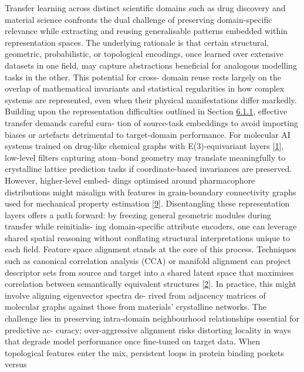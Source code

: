 \documentclass[
]{article}
\begin{document}
Transfer learning across distinct scientific domains such as drug
discovery and material science confronts the dual challenge of
preserving domain-specific relevance while extracting and reusing
generalisable patterns embedded within representation spaces. The
underlying rationale is that certain structural, geometric,
probabilistic, or topological encodings, once learned over extensive
datasets in one field, may capture abstractions beneficial for analogous
modelling tasks in the other. This potential for cross- domain reuse
rests largely on the overlap of mathematical invariants and statistical
regularities in how complex systems are represented, even when their
physical manifestations differ markedly. Building upon the
representation difficulties outlined in Section
\protect\hyperlink{shared-representation-challenges}{6.1.1}, effective
transfer demands careful cura- tion of source-task embeddings to avoid
importing biases or artefacts detrimental to target-domain performance.
For molecular AI systems trained on drug-like chemical graphs with
E(3)-equivariant layers {[}\protect\hyperlink{_bookmark41}{1}{]},
low-level filters capturing atom--bond geometry may translate
meaningfully to crystalline lattice prediction tasks if coordinate-based
invariances are preserved. However, higher-level embed- dings optimised
around pharmacophore distributions might misalign with features in
grain-boundary connectivity graphs used for mechanical property
estimation {[}\protect\hyperlink{_bookmark49}{9}{]}. Disentangling these
representation layers offers a path forward: by freezing general
geometric modules during transfer while reinitialis- ing domain-specific
attribute encoders, one can leverage shared spatial reasoning without
conflating structural interpretations unique to each field. Feature
space alignment stands at the core of this process. Techniques such as
canonical correlation analysis (CCA) or manifold alignment can project
descriptor sets from source and target into a shared latent space that
maximises correlation between semantically equivalent structures
{[}\protect\hyperlink{_bookmark42}{2}{]}. In practice, this might
involve aligning eigenvector spectra de- rived from adjacency matrices
of molecular graphs against those from materials' crystalline networks.
The challenge lies in preserving intra-domain neighbourhood
relationships essential for predictive ac- curacy; over-aggressive
alignment risks distorting locality in ways that degrade model
performance once fine-tuned on target data. When topological features
enter the mix, persistent loops in protein binding pockets versus
\end{document}
